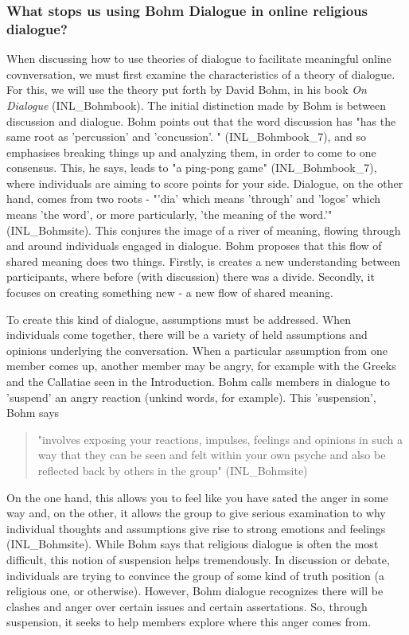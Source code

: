 \documentclass[]{article}
\begin{document}
\hypertarget{header-n336}{%
\subsubsection{What stops us using Bohm Dialogue in online religious
dialogue? }\label{header-n336}}

When discussing how to use theories of dialogue to facilitate meaningful
online covnversation, we must first examine the characteristics of a
theory of dialogue. For this, we will use the theory put forth by David
Bohm, in his book \emph{On Dialogue} (INL\_Bohmbook). The initial
distinction made by Bohm is between discussion and dialogue. Bohm points
out that the word discussion has "has the same root as 'percussion' and
'concussion'. " (INL\_Bohmbook\_7), and so emphasises breaking things up
and analyzing them, in order to come to one consensus. This, he says,
leads to "a ping-pong game" (INL\_Bohmbook\_7), where individuals are
aiming to score points for your side. Dialogue, on the other hand, comes
from two roots - "'dia' which means 'through' and 'logos' which means
'the word', or more particularly, 'the meaning of the
word.'"(INL\_Bohmsite). This conjures the image of a river of meaning,
flowing through and around individuals engaged in dialogue. Bohm
proposes that this flow of shared meaning does two things. Firstly, is
creates a new understanding between participants, where before (with
discussion) there was a divide. Secondly, it focuses on creating
something new - a new flow of shared meaning.

To create this kind of dialogue, assumptions must be addressed. When
individuals come together, there will be a variety of held assumptions
and opinions underlying the conversation. When a particular assumption
from one member comes up, another member may be angry, for example with
the Greeks and the Callatiae seen in the Introduction. Bohm calls
members in dialogue to 'suspend' an angry reaction (unkind words, for
example). This 'suspension', Bohm says

\begin{quote}
"involves exposing your reactions, impulses, feelings and opinions in
such a way that they can be seen and felt within your own psyche and
also be reflected back by others in the group" (INL\_Bohmsite)
\end{quote}

On the one hand, this allows you to feel like you have sated the anger
in some way and, on the other, it allows the group to give serious
examination to why individual thoughts and assumptions give rise to
strong emotions and feelings (INL\_Bohmsite). While Bohm says that
religious dialogue is often the most difficult, this notion of
suspension helps tremendously. In discussion or debate, individuals are
trying to convince the group of some kind of truth position (a religious
one, or otherwise). However, Bohm dialogue recognizes there will be
clashes and anger over certain issues and certain assertations. So,
through suspension, it seeks to help members explore where this anger
comes from.
\end{document}
